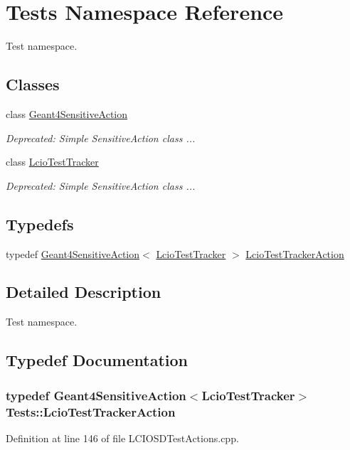 \hypertarget{namespace_tests}{
\section{Tests Namespace Reference}
\label{namespace_tests}
}


Test namespace.  
\subsection*{Classes}
\begin{DoxyCompactItemize}
\item 
class \hyperlink{class_tests_1_1_geant4_sensitive_action}{Geant4SensitiveAction}
\begin{DoxyCompactList}\small\item\em Deprecated: Simple SensitiveAction class ... \item\end{DoxyCompactList}\item 
class \hyperlink{class_tests_1_1_lcio_test_tracker}{LcioTestTracker}
\begin{DoxyCompactList}\small\item\em Deprecated: Simple SensitiveAction class ... \item\end{DoxyCompactList}\end{DoxyCompactItemize}
\subsection*{Typedefs}
\begin{DoxyCompactItemize}
\item 
typedef \hyperlink{class_tests_1_1_geant4_sensitive_action}{Geant4SensitiveAction}$<$ \hyperlink{class_tests_1_1_lcio_test_tracker}{LcioTestTracker} $>$ \hyperlink{namespace_tests_a2a7625ddf8e6d0dad5175dfc61402755}{LcioTestTrackerAction}
\end{DoxyCompactItemize}


\subsection{Detailed Description}
Test namespace. 

\subsection{Typedef Documentation}
\hypertarget{namespace_tests_a2a7625ddf8e6d0dad5175dfc61402755}{
\subsubsection[{LcioTestTrackerAction}]{\setlength{\rightskip}{0pt plus 5cm}typedef {\bf Geant4SensitiveAction}$<${\bf LcioTestTracker}$>$ {\bf Tests::LcioTestTrackerAction}}}
\label{namespace_tests_a2a7625ddf8e6d0dad5175dfc61402755}


Definition at line 146 of file LCIOSDTestActions.cpp.